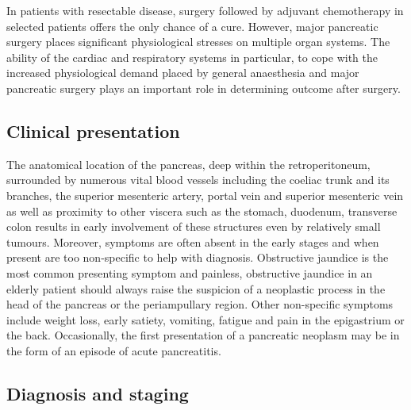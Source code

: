 In patients with resectable disease, surgery \parencite{sener_pancreatic_1999, sohn_resected_2000,geer_prognostic_1993} followed by adjuvant chemotherapy in selected patients \parencite{neoptolemos_randomized_2004, neoptolemos_adjuvant_2009} offers the only chance of a cure. 
However, major pancreatic surgery places significant physiological stresses on multiple organ systems. 
The ability of the cardiac and respiratory systems in particular, to cope with the increased physiological demand placed by general anaesthesia and major pancreatic surgery plays an important role in determining outcome after surgery.

\subsection{Clinical presentation}

The anatomical location of the pancreas, deep within the retroperitoneum, surrounded by numerous vital blood vessels including the coeliac trunk and its branches, the superior mesenteric artery, portal vein and superior mesenteric vein as well as proximity to other viscera such as the stomach, duodenum, transverse colon results in early involvement of these structures even by relatively small tumours. 
Moreover, symptoms are often absent in the early stages and when present are too non-specific to help with diagnosis. 
Obstructive jaundice is the most common presenting symptom and painless, obstructive jaundice in an elderly patient should always raise the suspicion of a neoplastic process in the head of the pancreas or the periampullary region. 
Other non-specific symptoms include weight loss, early satiety, vomiting, fatigue and pain in the epigastrium or the back. 
Occasionally, the first presentation of a pancreatic neoplasm may be in the form of an episode of acute pancreatitis.
 
\subsection{Diagnosis and staging}

